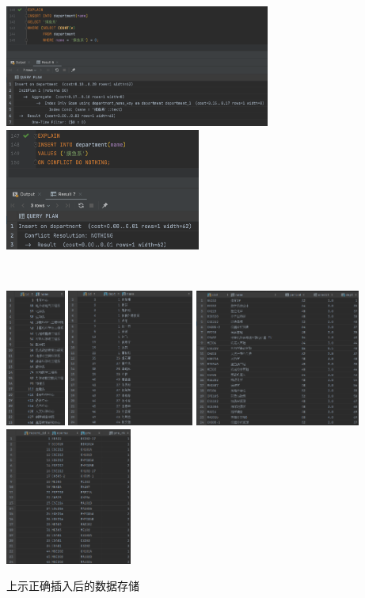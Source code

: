 \centerline{\includegraphics[height=4cm]{dta/ins1.png}\qquad\includegraphics[height=4cm]{dta/ins2.png}}
~\\
\centerline{\includegraphics[height=4.5cm]{dta/dept.png}
\quad\includegraphics[height=4.5cm]{dta/tech.png}
\quad\includegraphics[height=4.5cm]{dta/course.png}
\quad\includegraphics[height=4.5cm]{dta/preq.png}}
\scriptsize\centerline{上示正确插入后的数据存储}\normalsize
~\\


